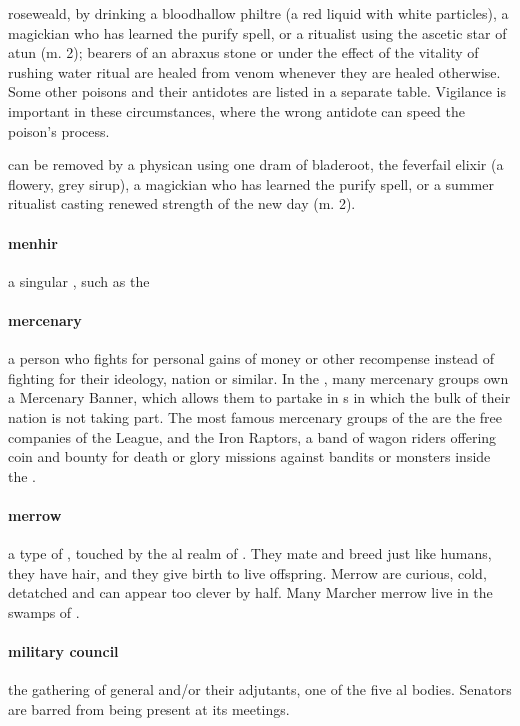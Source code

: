 {roseweald}, by drinking a bloodhallow philtre  (a red liquid with white particles), a magickian who has learned the purify spell, or a  ritualist using the  ascetic star of atun (m. 2); bearers of an abraxus stone or under the effect of the vitality of rushing water ritual are healed from venom whenever they are healed otherwise. \localpar Some other poisons and their antidotes are listed in a separate table. Vigilance is important in these circumstances, where the wrong antidote can speed the poison's process. \par{} can be removed by a physican using one dram of bladeroot, the feverfail elixir (a flowery, grey sirup), a magickian who has learned the purify spell, or a summer ritualist casting renewed strength of the new day (m. 2).   \bigparagraphendtwiddle
\paragraph{menhir} a singular , such as the 
\paragraph{mercenary} a person who fights for personal gains of money or other recompense instead of fighting for their ideology, nation or similar. In the , many mercenary groups own a Mercenary Banner, which allows them to partake in s in which the bulk of their nation is not taking part. The most famous mercenary groups of the  are the free companies of the League, and the Iron Raptors, a band of wagon riders offering coin and bounty for death or glory missions against bandits or monsters inside the .
\paragraph{merrow} a type of , touched by the al realm of . They mate and breed just like humans, they have hair, and they give birth to live offspring. Merrow are curious, cold, detatched and can appear too clever by half. Many Marcher merrow live in the swamps of .
\paragraph{military council} the gathering of general and/or their adjutants, one of the five \-al bodies. Senators are barred from being present at its meetings.
